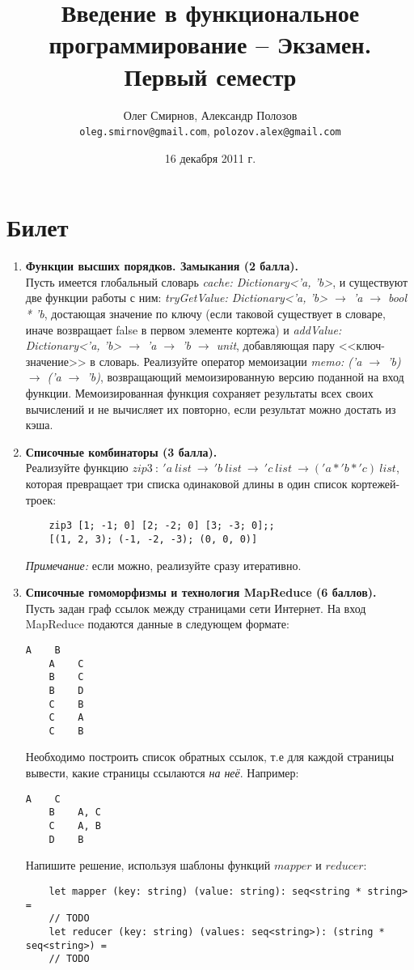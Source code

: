 \documentclass[a4paper,11pt]{article}
\author{Олег Смирнов, Александр Полозов \\
\texttt{oleg.smirnov@gmail.com}, \texttt{polozov.alex@gmail.com}}
\date{16 декабря 2011 г.}
\title{Введение в функциональное программирование -- Экзамен. Первый семестр}
\renewcommand{\emph}[1]{\textit{#1}}
\newcommand{\<}{\langle}
\renewcommand{\>}{\rangle}
\begin{document}
\maketitle
\newpage

\section*{Билет }
\begin{enumerate}
\item \textbf{Функции высших порядков. Замыкания (2 балла).}\\
  Пусть имеется глобальный словарь \textit{cache: Dictionary<'a, 'b>},
  и существуют две функции работы с ним:
  \textit{tryGetValue: Dictionary<'a, 'b> $\to$ 'a $\to$ bool * 'b}, достающая
  значение по ключу (если таковой существует в словаре, иначе возвращает
  false в первом элементе кортежа) и
  \textit{addValue: Dictionary<'a, 'b> $\to$ 'a $\to$ 'b $\to$ unit},
  добавляющая пару <<ключ-значение>> в словарь. Реализуйте оператор
  мемоизации \textit{memo: ('a $\to$ 'b) $\to$ ('a $\to$ 'b)}, возвращающий
  мемоизированную версию поданной на вход функции. Мемоизированная функция
  сохраняет результаты всех своих вычислений и не вычисляет их повторно,
  если результат можно достать из кэша.

\item \textbf{Списочные комбинаторы (3 балла).} \\
  Реализуйте функцию 
  $zip3~:~'\!a~list~\rightarrow~'\!b~list~\rightarrow~'\!c~list~\rightarrow
  ('\!a*'\!b*'\!c)~list$,
  которая превращает три списка одинаковой длины в один список кортежей-троек:
  \begin{lstlisting}
    zip3 [1; -1; 0] [2; -2; 0] [3; -3; 0];;
    [(1, 2, 3); (-1, -2, -3); (0, 0, 0)]
  \end{lstlisting}
  \emph{Примечание:} если можно, реализуйте сразу итеративно.

\item \textbf{Списочные гомоморфизмы и технология MapReduce (6 баллов).}\\
  Пусть задан граф ссылок между страницами сети Интернет. На вход MapReduce
  подаются данные в следующем формате:
  \begin{lstlisting}[language={}, basicstyle=\ttfamily\scriptsize]
    A    B
    A    C
    B    C
    B    D
    C    B
    C    A
    C    B
  \end{lstlisting}
  Необходимо построить список обратных ссылок, т.е для каждой страницы вывести,
  какие страницы ссылаются \emph{на неё}. Например:
  \begin{lstlisting}[language={}, basicstyle=\ttfamily\scriptsize]
    A    C
    B    A, C
    C    A, B
    D    B
  \end{lstlisting}
  Напишите решение, используя шаблоны функций $mapper$ и $reducer$:
  \begin{lstlisting}
    let mapper (key: string) (value: string): seq<string * string> =
    // TODO
    let reducer (key: string) (values: seq<string>): (string * seq<string>) =
    // TODO
  \end{lstlisting}
\end{enumerate}
\newpage
\end{document}
